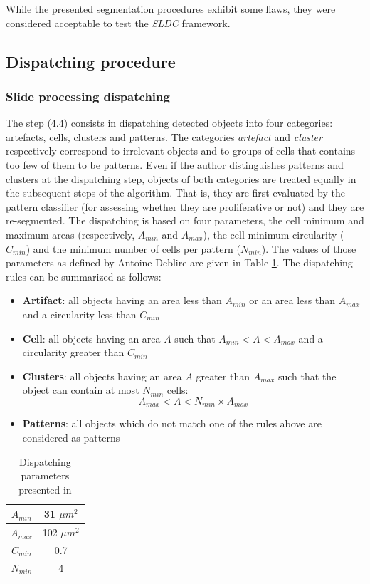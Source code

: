 While the presented segmentation procedures exhibit some flaws, they were considered acceptable to test the \textit{SLDC} framework. 

\subsection{Dispatching procedure}
\label{ssec:thyroid_ad_dispatch}

\subsubsection{Slide processing dispatching}

The step (4.4) consists in dispatching detected objects into four categories: artefacts, cells, clusters and patterns. The categories \textit{artefact} and \textit{cluster} respectively correspond to irrelevant objects and to groups of cells that contains too few of them to be patterns. Even if the author distinguishes patterns and clusters at the dispatching step, objects of both categories are treated equally in the subsequent steps of the algorithm. That is, they are first evaluated by the pattern classifier (for assessing whether they are proliferative or not) and they are re-segmented. The dispatching is based on four parameters, the cell minimum and maximum areas (respectively, $A_{min}$ and $A_{max}$), the cell minimum circularity ($C_{min}$) and the minimum number of cells per pattern ($N_{min}$). The values of those parameters as defined by Antoine Deblire are given in Table \ref{tab:adeb_disp_rules}. The dispatching rules can be summarized as follows:

\begin{itemize}
	\item \textbf{Artifact}: all objects having an area less than $A_{min}$ or an area less than $A_{max}$ and a circularity less than $C_{min}$
	\item \textbf{Cell}: all objects having an area $A$ such that $A_{min} < A < A_{max}$ and a circularity greater than $C_{min}$
	\item \textbf{Clusters}: all objects having an area $A$ greater than $A_{max}$ such that the object can contain at most $N_{min}$ cells:
	\[
		A_{max} < A < N_{min} \times A_{max}
	\]
	\item \textbf{Patterns}: all objects which do not match one of the rules above are considered as patterns
\end{itemize}

\begin{table}
	\center
	\begin{tabular}{|c|c|}
		\hline
		$A_{min}$ & 31 $\mu m^2$\\
		\hline
		$A_{max}$ & 102 $\mu m^2$\\
		\hline
		$C_{min}$ & 0.7 \\
		\hline
		$N_{min}$ & 4\\
		\hline
	\end{tabular}
	\caption{Dispatching parameters presented in \cite{adeblire2013}}
	\label{tab:adeb_disp_rules}
\end{table}

